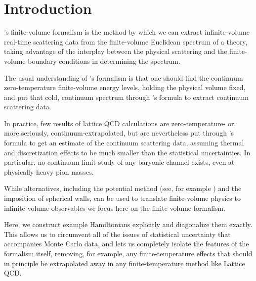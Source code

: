 \section{Introduction}\label{sec:intro}


\Luscher's finite-volume formalism\cite{Hamber198399,luscher:1986I,luscher:1986II,wiese1989,Luscher1991,Luscher1991237} is the method by which we can extract infinite-volume real-time scattering data from the finite-volume Euclidean spectrum of a theory, taking advantage of the interplay between the physical scattering and the finite-volume boundary conditions in determining the spectrum.

The usual understanding of \Luscher's formalism is that one should find the continuum zero-temperature finite-volume energy levels, holding the physical volume fixed, and put that cold, continuum spectrum through \Luscher's formula to extract continuum scattering data.

In practice, few results of lattice QCD calculations are zero-temperature- or, more seriously, continuum-extrapolated, but are nevertheless put through \Luscher's formula to get an estimate of the continuum scattering data, assuming thermal and discretization effects to be much smaller than the statistical uncertainties.
In particular, no continuum-limit study of any baryonic channel exists, even at physically heavy pion masses.

While alternatives, including the potential method (see, for example ) and the imposition of spherical walls\cite{Borasoy:2007vy,Borasoy:2007vi,Lee:2008fa,Epelbaum:2008vj,Epelbaum:2010xt,Elhatisari:2015iga,Elhatisari:2016owd,Elhatisari:2016hby,Klein:2018lqz,Li:2019ldq,Bovermann:2019jbt}, can be used to translate finite-volume physics to infinite-volume observables we focus here on the \Luscher finite-volume formalism.

Here, we construct example Hamiltonians explicitly and diagonalize them exactly.
This allows us to circumvent all of the issues of statistical uncertainty that accompanies Monte Carlo data, and lets us completely isolate the features of the formalism itself, removing, for example, any finite-temperature effects that should in principle be extrapolated away in any finite-temperature method like Lattice QCD.

